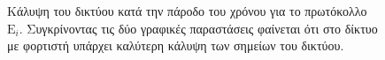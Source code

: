 \begin{figure}[H]
  \centering
  \caption{Κάλυψη του δικτύου κατά την πάροδο του χρόνου για το πρωτόκολλο $\text{E}_{i}$. Συγκρίνοντας τις δύο γραφικές παραστάσεις φαίνεται ότι στο δίκτυο με
φορτιστή
υπάρχει καλύτερη κάλυψη των σημείων του δικτύου.}
  \label{fig:1exp_3_3}
\end{figure}





